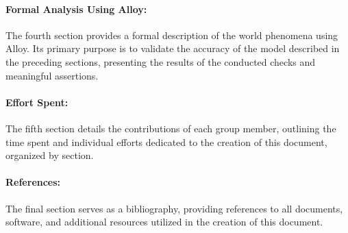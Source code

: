 \paragraph{Formal Analysis Using Alloy:} The fourth section provides a formal description of the world phenomena using Alloy. Its primary purpose is to validate the accuracy of the model described in the preceding sections, presenting the results of the conducted checks and meaningful assertions.
\paragraph{Effort Spent:} The fifth section details the contributions of each group member, outlining the time spent and individual efforts dedicated to the creation of this document, organized by section.
\paragraph{References:} The final section serves as a bibliography, providing references to all documents, software, and additional resources utilized in the creation of this document.